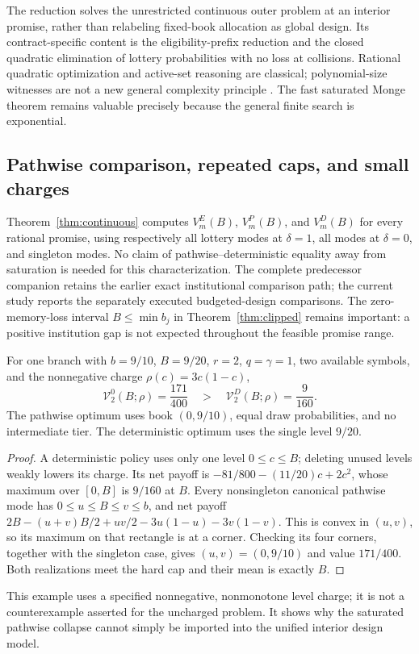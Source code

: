 The reduction solves the unrestricted continuous outer problem at an interior promise, rather than relabeling fixed-book allocation as global design. Its contract-specific content is the eligibility-prefix reduction and the closed quadratic elimination of lottery probabilities with no loss at collisions. Rational quadratic optimization and active-set reasoning are classical; polynomial-size witnesses are not a new general complexity principle \citep{DelPiaEtAl2017}. The fast saturated Monge theorem remains valuable precisely because the general finite search is exponential.

\subsection{Pathwise comparison, repeated caps, and small charges}
Theorem~\ref{thm:continuous} computes $V_m^E(B)$, $V_m^P(B)$, and $V_m^D(B)$ for every rational promise, using respectively all lottery modes at $\delta=1$, all modes at $\delta=0$, and singleton modes. No claim of pathwise--deterministic equality away from saturation is needed for this characterization. The complete predecessor companion retains the earlier exact institutional comparison path; the current study reports the separately executed budgeted-design comparisons. The zero-memory-loss interval $B\leq\min b_j$ in Theorem~\ref{thm:clipped} remains important: a positive institution gap is not expected throughout the feasible promise range.

\begin{proposition}\label{prop:pathwise-interior}
For one branch with $b=9/10$, $B=9/20$, $r=2$, $q=\gamma=1$, two available symbols, and the nonnegative charge $\rho(c)=3c(1-c)$,
\[
 \mathcal V_2^0(B;\rho)=\frac{171}{400}
 \quad>\quad
 \mathcal V_2^D(B;\rho)=\frac9{160}.
\]
The pathwise optimum uses book $(0,9/10)$, equal draw probabilities, and no intermediate tier. The deterministic optimum uses the single level $9/20$.
\end{proposition}
\begin{proof}
A deterministic policy uses only one level $0\leq c\leq B$; deleting unused levels weakly lowers its charge. Its net payoff is $-81/800-(11/20)c+2c^2$, whose maximum over $[0,B]$ is $9/160$ at $B$. Every nonsingleton canonical pathwise mode has $0\leq u\leq B\leq v\leq b$, and net payoff
$2B-(u+v)B/2+uv/2-3u(1-u)-3v(1-v)$.
This is convex in $(u,v)$, so its maximum on that rectangle is at a corner. Checking its four corners, together with the singleton case, gives $(u,v)=(0,9/10)$ and value $171/400$. Both realizations meet the hard cap and their mean is exactly $B$.
\end{proof}
This example uses a specified nonnegative, nonmonotone level charge; it is not a counterexample asserted for the uncharged problem. It shows why the saturated pathwise collapse cannot simply be imported into the unified interior design model.

